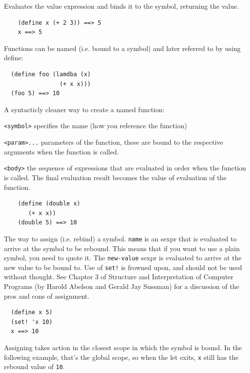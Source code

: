 \documentclass[12pt]{article}
\begin{document}

Evaluates the value expression and binds it to the symbol, returning
the value. 

\begin{verbatim}
    (define x (+ 2 3)) ==> 5
    x ==> 5
\end{verbatim}

Functions can be named (i.e. bound to a symbol) and later referred to
by using define:

\begin{verbatim}
  (define foo (lamdba (x) 
                (+ x x)))
  (foo 5) ==> 10  
\end{verbatim}



A syntacticly cleaner way to create a named function:

\verb|<symbol>| specifies the name (how you reference the function)

\verb|<param>...| parameters of the function, these are bound to the
respective arguments when the function is called. 

\verb|<body>| the sequence of expressions that are evaluated in order
when the function is called. The final evaluation result becomes the
value of evaluation of the function. 

\begin{verbatim}
    (define (double x)
       (+ x x))
    (double 5) ==> 10
\end{verbatim}


The way to assign (i.e. rebind) a symbol. \verb|name| is an sexpr that is evaluated
to arrive at the symbol to be rebound. This means that if you want to
use a plain symbol, you need to quote it. The \verb|new-value| sexpr is
evaluated to arrive at the new value to be bound to. Use of
\verb|set!| is frowned upon, and should not be used without thought.
See Chapter 3 of Structure and Interpretation of Computer Programs (by
Harold Abelson and Gerald Jay Sussman) for a discussion of the pros
and cons of assignment.

\begin{verbatim}
  (define x 5)
  (set! 'x 10)
  x ==> 10
\end{verbatim}

Assigning takes action in the closest scope in which the symbol is
bound. In the following example, that's the global scope, so when the
let exits, \verb|x| still has the rebound value of \verb|10|.
\end{document}
